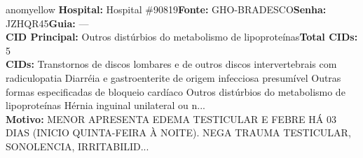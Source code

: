 \documentclass[a4paper,10pt]{article}
\begin{document}
\begin{anomalycard}[Interna\c{c}\~{a}o \#118211 | Pac. \#98092 | MODERADO (z=2.64) | LOS: 3d | 21/02/2026\,$\to$\,24/02/2026]{anomyellow}
\textbf{Hospital:} Hospital \#90819\quad \textbf{Fonte:} GHO-BRADESCO\quad \textbf{Senha:} JZHQR45\quad \textbf{Guia:} ---\\

\textbf{CID Principal:} {\small Outros distúrbios do metabolismo de lipoproteínas}\quad\textbf{Total CIDs:} 5\\

\textbf{CIDs:} {\scriptsize Transtornos de discos lombares e de outros discos intervertebrais com radiculopatia \textbar{} Diarréia e gastroenterite de origem infecciosa presumível \textbar{} Outras formas especificadas de bloqueio cardíaco \textbar{} Outros distúrbios do metabolismo de lipoproteínas \textbar{} Hérnia inguinal unilateral ou n...}\\

\textbf{Motivo:} {\scriptsize MENOR APRESENTA EDEMA TESTICULAR E FEBRE HÁ 03 DIAS (INICIO QUINTA-FEIRA À NOITE). NEGA TRAUMA TESTICULAR, SONOLENCIA, IRRITABILID...}\\




\end{anomalycard}
\end{document}
